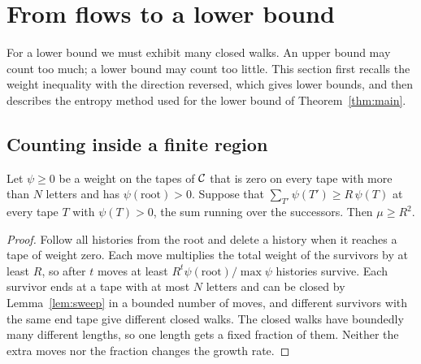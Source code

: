 \section{From flows to a lower bound}\label{sec:flows}

For a lower bound we must exhibit many closed walks. An upper bound may count too much; a lower bound may count too
little. This section first recalls the weight inequality with the direction reversed, which gives lower bounds, and
then describes the entropy method used for the lower bound of Theorem~\ref{thm:main}.

\subsection{Counting inside a finite region}

\begin{lemma}\label{lem:region}
Let $\psi\ge0$ be a weight on the tapes of $\mathcal{C}$ that is zero on every tape with more than $N$ letters and has
$\psi(\text{root})>0$. Suppose that $\sum_{T'}\psi(T')\ge R\,\psi(T)$ at every tape $T$ with $\psi(T)>0$, the sum running
over the successors. Then $\mu\ge R^2$.
\end{lemma}

\begin{proof}
Follow all histories from the root and delete a history when it reaches a tape of weight zero. Each move multiplies
the total weight of the survivors by at least $R$, so after $t$ moves at least $R^t\psi(\text{root})/\max\psi$
histories survive. Each survivor ends at a tape with at most $N$ letters and can be closed by Lemma~\ref{lem:sweep} in a
bounded number of moves, and different survivors with the same end tape give different closed walks. The closed walks
have boundedly many different lengths, so one length gets a fixed fraction of them. Neither the extra moves nor the
fraction changes the growth rate.
\end{proof}

